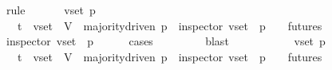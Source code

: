 \begin{isabellebody}
\ {\isacharparenleft}rule{\isacharplus}{\isacharparenright}\isanewline
{}\isamarkupfalse%
\ {\isacharminus}\isanewline
\ \ \isamarkupfalse%
\ {\isasymsigma}\ v{\isacharunderscore}set\ p\ {\isasymsigma}{\isacharprime}\isanewline
\ \ \isamarkupfalse%
\ {\isachardoublequoteopen}{\isasymsigma}\ {\isasymin}\ {\isasymSigma}t\ {\isasymand}\ v{\isacharunderscore}set\ {\isasymsubseteq}\ V{\isachardoublequoteclose}\ \ {\isachardoublequoteopen}majority{\isacharunderscore}driven\ p{\isachardoublequoteclose}\ \ {\isachardoublequoteopen}inspector\ {\isacharparenleft}v{\isacharunderscore}set{\isacharcomma}\ {\isasymsigma}{\isacharcomma}\ p{\isacharparenright}{\isachardoublequoteclose}\ \ {\isachardoublequoteopen}{\isasymsigma}{\isacharprime}\ {\isasymin}\ futures\ {\isasymsigma}{\isachardoublequoteclose}\isanewline
\ \ \isamarkupfalse%
\ \isamarkupfalse%
\ {\isachardoublequoteopen}inspector\ {\isacharparenleft}v{\isacharunderscore}set{\isacharcomma}\ {\isasymsigma}{\isacharprime}{\isacharcomma}\ p{\isacharparenright}{\isachardoublequoteclose}\isanewline
\ \ \ \ \isamarkupfalse%
\ {\isacharparenleft}cases\ {\isachardoublequoteopen}{\isasymsigma}\ {\isacharequal}\ {\isasymsigma}{\isacharprime}{\isachardoublequoteclose}{\isacharparenright}\isanewline
\ \ \ \ \isamarkupfalse%
\ blast\isanewline
\ \ \isamarkupfalse%
\ {\isacharminus}\isanewline
\ \ \ \ \isamarkupfalse%
\ {\isasymsigma}\ v{\isacharunderscore}set\ p\ {\isasymsigma}{\isacharprime}\isanewline
\ \ \ \ \isamarkupfalse%
\ {\isachardoublequoteopen}{\isasymsigma}\ {\isasymin}\ {\isasymSigma}t\ {\isasymand}\ v{\isacharunderscore}set\ {\isasymsubseteq}\ V{\isachardoublequoteclose}\ \ {\isachardoublequoteopen}majority{\isacharunderscore}driven\ p{\isachardoublequoteclose}\ \ {\isachardoublequoteopen}inspector\ {\isacharparenleft}v{\isacharunderscore}set{\isacharcomma}\ {\isasymsigma}{\isacharcomma}\ p{\isacharparenright}{\isachardoublequoteclose}\ \ {\isachardoublequoteopen}{\isasymsigma}{\isacharprime}\ {\isasymin}\ futures\ {\isasymsigma}{\isachardoublequoteclose}\ \ {\isachardoublequoteopen}{\isasymsigma}\ {\isasymnoteq}\ {\isasymsigma}{\isacharprime}{\isachardoublequoteclose}\isanewline
\ \ \ \ \isamarkupfalse%
\ \isamarkupfalse%
\ {\isachardoublequoteopen}{\isasymsigma}\ {\isasymsubset}\ {\isasymsigma}{\isacharprime}\ {\isachardoublequoteclose}\isanewline

\end{isabellebody}
